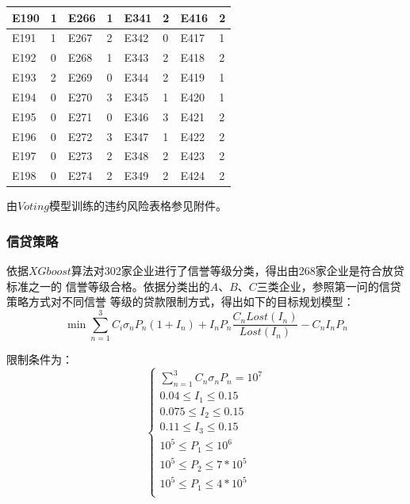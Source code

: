 \documentclass[UTF8]{ctexart}
\begin{document}
\begin{table}[H]
\begin{tabular}{|l|l|l|l|l|l|l|l|}
		E190     & 1        & E266     & 1        & E341     & 2        & E416     & 2        \\ \hline
		E191     & 1        & E267     & 2        & E342     & 0        & E417     & 1        \\ \hline
		E192     & 0        & E268     & 1        & E343     & 2        & E418     & 2        \\ \hline
		E193     & 2        & E269     & 0        & E344     & 2        & E419     & 1        \\ \hline
		E194     & 0        & E270     & 3        & E345     & 1        & E420     & 1        \\ \hline
		E195     & 0        & E271     & 0        & E346     & 3        & E421     & 2        \\ \hline
		E196     & 0        & E272     & 3        & E347     & 1        & E422     & 2        \\ \hline
		E197     & 0        & E273     & 2        & E348     & 2        & E423     & 2        \\ \hline
		E198     & 0        & E274     & 2        & E349     & 2        & E424     & 2        \\ \hline
	\end{tabular}
\end{table}

由$Voting$模型训练的违约风险表格参见附件。

\subsubsection{信贷策略}
依据$XGboost$算法对302家企业进行了信誉等级分类，得出由268家企业是符合放贷标准之一的
信誉等级合格。依据分类出的$A$、$B$、$C$三类企业，参照第一问的信贷策略方式对不同信誉
等级的贷款限制方式，得出如下的目标规划模型：
\begin{equation}
	\min \sum_{n = 1}^{3}C_i\sigma_n P_n (1+I_n)+I_n P_n \frac{C_n Lost(I_n)}{Lost(I_n)}-C_n I_n P_n
\end{equation}

\newpage

限制条件为：
\[\left\{\begin{array}{lllll}
		\sum_{n = 1}^{3}C_n \sigma_n P_n = 10^7 \\
		0.04 \le I_1 \le 0.15                   \\
		0.075 \le I_2 \le 0.15                  \\
		0.11 \le I_3 \le 0.15                   \\
		10^5 \le P_1 \le 10^6                   \\
		10^5 \le P_2 \le 7*10^5                 \\
		10^5 \le P_1 \le 4*10^5                 \\
	\end{array}\right. \]
\end{document}
